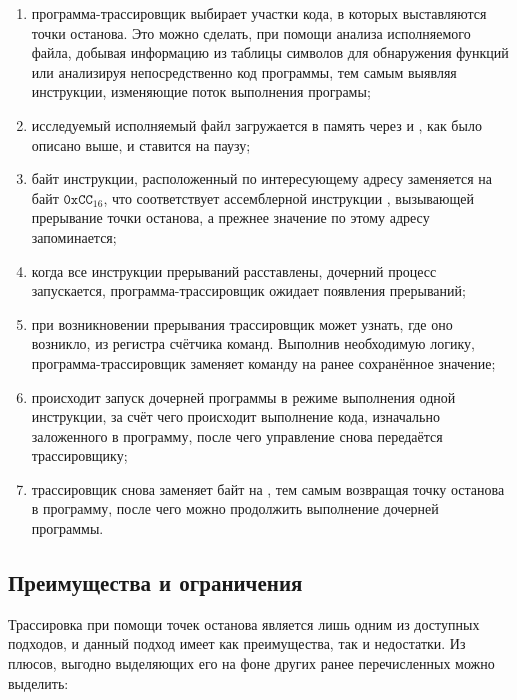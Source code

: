 \begin{enumerate}
	\item программа-трассировщик выбирает участки кода, в которых выставляются точки останова. Это можно сделать, при помощи анализа исполняемого файла, добывая информацию из таблицы символов для обнаружения функций или анализируя непосредственно код программы, тем самым выявляя инструкции, изменяющие поток выполнения програмы;
	
	\item исследуемый исполняемый файл загружается в память через  и , как было описано выше, и ставится на паузу;
	
	\item байт инструкции, расположенный по интересующему адресу заменяется на байт $\mathtt{0xCC}_{16}$, что соответствует ассемблерной инструкции , вызывающей прерывание точки останова, а прежнее значение по этому адресу запоминается;
	
	\item когда все инструкции прерываний расставлены, дочерний процесс запускается, программа-трассировщик ожидает появления прерываний;
	
	\item при возникновении прерывания трассировщик может узнать, где оно возникло, из регистра счётчика команд. Выполнив необходимую логику, программа-трассировщик заменяет команду на ранее сохранённое значение;
	
	\item происходит запуск дочерней программы в режиме выполнения одной инструкции, за счёт чего происходит выполнение кода, изначально заложенного в программу, после чего управление снова передаётся трассировщику;
	
	\item трассировщик снова заменяет байт на , тем самым возвращая точку останова в программу, после чего можно продолжить выполнение дочерней программы.
\end{enumerate}

\subsection{Преимущества и ограничения}

Трассировка при помощи точек останова является лишь одним из доступных подходов, и данный подход имеет как преимущества, так и недостатки. Из плюсов, выгодно выделяющих его на фоне других ранее перечисленных можно выделить:

